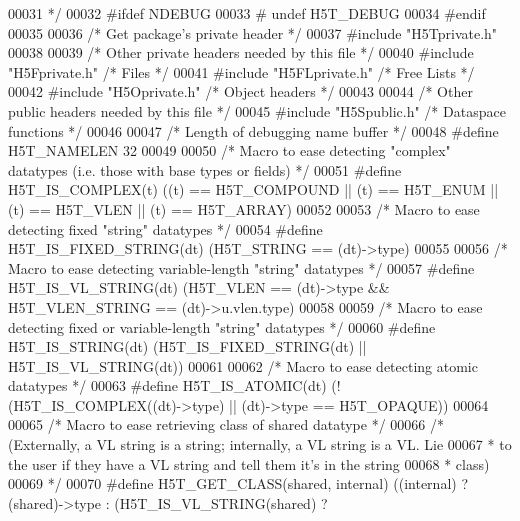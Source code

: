 \begin{DoxyCode}
00031 \textcolor{comment}{ */}
00032 \textcolor{preprocessor}{#ifdef NDEBUG}
00033 \textcolor{preprocessor}{#  undef H5T\_DEBUG}
00034 \textcolor{preprocessor}{#endif}
00035 
00036 \textcolor{comment}{/* Get package's private header */}
00037 \textcolor{preprocessor}{#include "H5Tprivate.h"}
00038 
00039 \textcolor{comment}{/* Other private headers needed by this file */}
00040 \textcolor{preprocessor}{#include "H5Fprivate.h"}     \textcolor{comment}{/* Files                */}
00041 \textcolor{preprocessor}{#include "H5FLprivate.h"}    \textcolor{comment}{/* Free Lists               */}
00042 \textcolor{preprocessor}{#include "H5Oprivate.h"}     \textcolor{comment}{/* Object headers           */}
00043 
00044 \textcolor{comment}{/* Other public headers needed by this file */}
00045 \textcolor{preprocessor}{#include "H5Spublic.h"}      \textcolor{comment}{/* Dataspace functions          */}
00046 
00047 \textcolor{comment}{/* Length of debugging name buffer */}
00048 \textcolor{preprocessor}{#define H5T\_NAMELEN     32}
00049 
00050 \textcolor{comment}{/* Macro to ease detecting "complex" datatypes (i.e. those with base types or fields) */}
00051 \textcolor{preprocessor}{#define H5T\_IS\_COMPLEX(t)       ((t) == H5T\_COMPOUND || (t) == H5T\_ENUM || (t) == H5T\_VLEN || (t) ==
       H5T\_ARRAY)}
00052 
00053 \textcolor{comment}{/* Macro to ease detecting fixed "string" datatypes */}
00054 \textcolor{preprocessor}{#define H5T\_IS\_FIXED\_STRING(dt) (H5T\_STRING == (dt)->type)}
00055 
00056 \textcolor{comment}{/* Macro to ease detecting variable-length "string" datatypes */}
00057 \textcolor{preprocessor}{#define H5T\_IS\_VL\_STRING(dt)    (H5T\_VLEN == (dt)->type && H5T\_VLEN\_STRING == (dt)->u.vlen.type)}
00058 
00059 \textcolor{comment}{/* Macro to ease detecting fixed or variable-length "string" datatypes */}
00060 \textcolor{preprocessor}{#define H5T\_IS\_STRING(dt)       (H5T\_IS\_FIXED\_STRING(dt) || H5T\_IS\_VL\_STRING(dt))}
00061 
00062 \textcolor{comment}{/* Macro to ease detecting atomic datatypes */}
00063 \textcolor{preprocessor}{#define H5T\_IS\_ATOMIC(dt)       (!(H5T\_IS\_COMPLEX((dt)->type) || (dt)->type == H5T\_OPAQUE))}
00064 
00065 \textcolor{comment}{/* Macro to ease retrieving class of shared datatype */}
00066 \textcolor{comment}{/* (Externally, a VL string is a string; internally, a VL string is a VL.  Lie}
00067 \textcolor{comment}{ *      to the user if they have a VL string and tell them it's in the string}
00068 \textcolor{comment}{ *      class)}
00069 \textcolor{comment}{ */}
00070 \textcolor{preprocessor}{#define H5T\_GET\_CLASS(shared, internal) ((internal) ? (shared)->type : (H5T\_IS\_VL\_STRING(shared) ? 
}
\end{DoxyCode}
